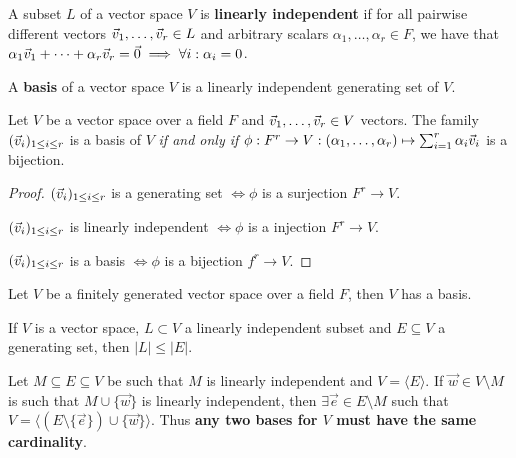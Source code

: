 \begin{multicols}{2}
\begin{definition}
A subset $L$ of a vector space $V$ is \textbf{linearly independent} if for all pairwise different vectors $\vec{v}_1,\dots,\vec{v}_r \in L$ and arbitrary scalars $\alpha_1,\dots,\alpha_r\in F$, we have that $\alpha_1\vec{v}_1+\dots+\alpha_r\vec{v}_r = \vec{0} \implies \forall i: \alpha_i = 0$.
\end{definition}

\begin{definition}
A \textbf{basis} of a vector space $V$ is a linearly independent generating set of $V$.
\end{definition}

\begin{theorem}[1.5.11]
Let $V$ be a vector space over a field $F$ and $\vec{v}_1,\dots,\vec{v}_r\in V$ vectors. The family $(\vec{v}_i)_{1\leq i\leq r}$ is a basis of $V$ \textit{if and only if} $\phi:F^r\to V:(\alpha_1,\dots,\alpha_r)\mapsto \sum_{i=1}^r\alpha_i\vec{v}_i$ is a bijection.
\end{theorem}
\begin{proof}
$(\vec{v}_i)_{1\leq i\leq r}$ is a generating set $\Leftrightarrow \phi$ is a surjection $F^r\to V$.

$(\vec{v}_i)_{1\leq i\leq r}$ is linearly independent $\Leftrightarrow \phi$ is a injection $F^r\to V$.

$(\vec{v}_i)_{1\leq i\leq r}$ is a basis $\Leftrightarrow \phi$ is a bijection $f^r\to V$.
\end{proof}

\begin{theorem}[1.5.13]
Let $V$ be a finitely generated vector space over a field $F$, then $V$ has a basis.
\end{theorem}

\begin{theorem}
If $V$ is a vector space, $L\subset V$ a linearly independent subset and $E\subseteq V$ a generating set, then $|L|\leq |E|$.
\end{theorem}

\begin{theorem} 
Let $M\subseteq E\subseteq V$ be such that $M$ is linearly independent and $V=\langle E\rangle$. If $\vec{w} \in V \setminus M$ is such that $M\cup \{\vec{w}\}$ is linearly independent, then $\exists\vec{e} \in E \setminus M$ such that $V=\langle (E \setminus \{\vec{e}\}) \cup \{\vec{w}\}\rangle$. Thus \textbf{any two bases for $V$ must have the same cardinality}.
\end{theorem}


\end{multicols}
